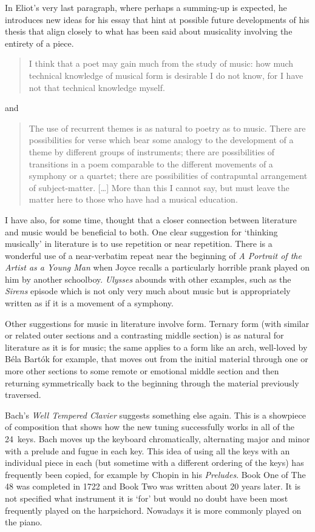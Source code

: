 In Eliot's very last paragraph, where perhaps a summing-up is
expected, he introduces new ideas for his essay that hint at possible
future developments of his thesis that align closely to what has been
said about musicality involving the entirety of a piece.
\begin{quote}
I think that a poet may gain much from the study of music: how much
technical knowledge of musical form is desirable I do not know, for I
have not that technical knowledge myself.
\end{quote}
and
\begin{quote}
The use of recurrent themes is as natural to poetry as to music.
There are possibilities for verse which bear some analogy to the
development of a theme by different groups of instruments; there are
possibilities of transitions in a poem comparable to the different
movements of a symphony or a quartet; there are possibilities of
contrapuntal arrangement of subject-matter.  [\ldots] More than this I
cannot say, but must leave the matter here to those who have had a
musical education.
\end{quote}

I have also, for some time, thought that a closer connection between
literature and music would be beneficial to both.  One clear
suggestion for `thinking musically' in literature is to use repetition
or near repetition.  There is a wonderful use of a near-verbatim
repeat near the beginning of \textit{A Portrait of the Artist as a
Young Man} when Joyce recalls a particularly horrible prank played on
him by another schoolboy. \textit{Ulysses} abounds with other examples,
such as the \textit{Sirens} episode which is not only very much about music but
is appropriately written as if it is a movement of a symphony.

Other suggestions for music in literature involve form.  Ternary form
(with similar or related outer sections and a contrasting middle
section) is as natural for literature as it is for music; the same applies to a form like
an arch, well-loved by B\'ela Bart\'ok for example, that moves out from the initial
material through one or more other sections to some remote or
emotional middle section and then returning symmetrically back to the
beginning through the material previously traversed.

Bach's \textit{Well Tempered Clavier} suggests something else again.
This is a showpiece of composition that shows how the new tuning
successfully works in all of the 24~keys.  Bach moves up the keyboard
chromatically, alternating major and minor with a prelude and fugue in each key.
This idea of using all the
keys with an individual piece in each (but sometime with a different
ordering of the keys) has frequently been copied, for example
by Chopin in his \textit{Preludes}.
Book One of The 48 was completed in 1722 and Book Two was
written about 20 years later. It is not specified what instrument it
is `for' but would no doubt have been most frequently played on the
harpsichord.  Nowadays it is more commonly played on the piano.

